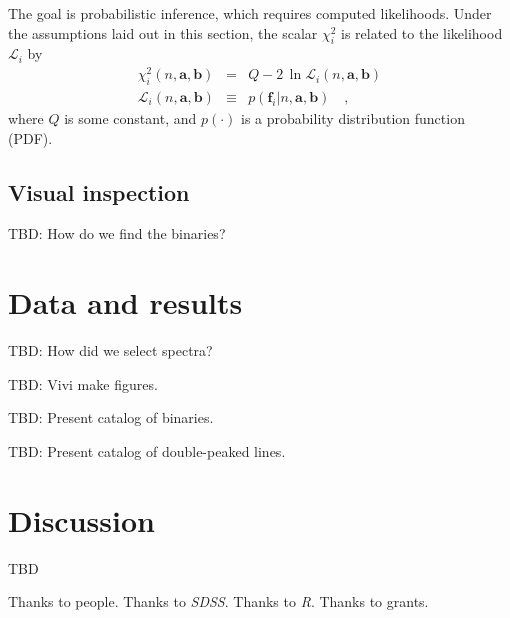 \documentclass[preprint]{aastex}
\newcommand{\project}[1]{\textsl{#1}}
\newcommand{\SDSS}{\project{SDSS}}
\newcommand{\mmatrix}[1]{\boldsymbol{#1}}
\newcommand{\avec}{\mmatrix{a}}
\newcommand{\bvec}{\mmatrix{b}}
\newcommand{\fvec}{\mmatrix{f}}
\newcommand{\like}{\mathscr{L}}
\begin{document}
The goal is probabilistic inference, which requires computed
likelihoods.  Under the assumptions laid out in this section, the
scalar $\chi^2_i$ is related to the likelihood $\like_i$ by
\begin{eqnarray}\displaystyle
\chi^2_i(n,\avec,\bvec) &=& Q - 2\,\ln\like_i(n,\avec,\bvec) \nonumber\\
\like_i(n,\avec,\bvec) &\equiv& p(\fvec_i|n,\avec,\bvec)
\quad ,
\end{eqnarray}
where $Q$ is some constant, and $p(\cdot)$ is a probability
distribution function (PDF).

\subsection{Visual inspection}

TBD:  How do we find the binaries?

\section{Data and results}

TBD:  How did we select spectra?

TBD:  Vivi make figures.

TBD:  Present catalog of binaries.

TBD:  Present catalog of double-peaked lines.

\section{Discussion}

TBD

\acknowledgements Thanks to people.  Thanks to \SDSS.  Thanks to
\project{R}.  Thanks to grants.
\end{document}
